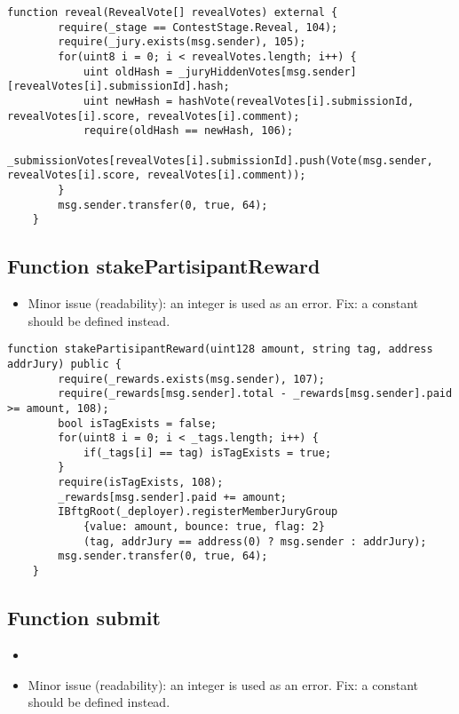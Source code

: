\begin{lstlisting}[firstnumber=155]
    function reveal(RevealVote[] revealVotes) external {
        require(_stage == ContestStage.Reveal, 104);
        require(_jury.exists(msg.sender), 105);
        for(uint8 i = 0; i < revealVotes.length; i++) {
            uint oldHash = _juryHiddenVotes[msg.sender][revealVotes[i].submissionId].hash;
            uint newHash = hashVote(revealVotes[i].submissionId, revealVotes[i].score, revealVotes[i].comment);
            require(oldHash == newHash, 106);
            _submissionVotes[revealVotes[i].submissionId].push(Vote(msg.sender, revealVotes[i].score, revealVotes[i].comment));
        }
        msg.sender.transfer(0, true, 64);
    }
\end{lstlisting}

\subsection{Function stakePartisipantReward}

\begin{itemize}
\item Minor issue (readability): an integer is used as an error. Fix:
  a constant should be defined instead.
\end{itemize}

\begin{lstlisting}[firstnumber=204]
    function stakePartisipantReward(uint128 amount, string tag, address addrJury) public {
        require(_rewards.exists(msg.sender), 107);
        require(_rewards[msg.sender].total - _rewards[msg.sender].paid >= amount, 108);
        bool isTagExists = false;
        for(uint8 i = 0; i < _tags.length; i++) {
            if(_tags[i] == tag) isTagExists = true;
        }
        require(isTagExists, 108);
        _rewards[msg.sender].paid += amount;
        IBftgRoot(_deployer).registerMemberJuryGroup
            {value: amount, bounce: true, flag: 2}
            (tag, addrJury == address(0) ? msg.sender : addrJury);
        msg.sender.transfer(0, true, 64);
    }
\end{lstlisting}

\subsection{Function submit}

\begin{itemize}
\item {}
\item Minor issue (readability): an integer is used as an error. Fix:
  a constant should be defined instead.
\end{itemize}

